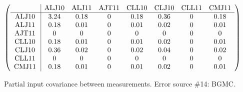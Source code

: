 \begin{table}[H]
\scriptsize
\begin{center}
\renewcommand{\arraystretch}{1.1}
\begin{math}\left(\begin{array}{c|ccccccc}
 & \mathrm{ALJ10} & 
\mathrm{ALJ11} & 
\mathrm{AJT11} & 
\mathrm{CLL10} & 
\mathrm{CLJ10} & 
\mathrm{CLL11} & 
\mathrm{CMJ11} \\
\hline
\mathrm{ALJ10} \hspace*{2pt} &       3.24 &       0.18 &  0 &       0.18 &       0.36 &  0 &       0.18 \\
\mathrm{ALJ11} \hspace*{2pt} &       0.18 &       0.01 &  0 &       0.01 &       0.02 &  0 &       0.01 \\
\mathrm{AJT11} \hspace*{2pt} &  0 &  0 &  0 &  0 &  0 &  0 &  0 \\
\mathrm{CLL10} \hspace*{2pt} &       0.18 &       0.01 &  0 &       0.01 &       0.02 &  0 &       0.01 \\
\mathrm{CLJ10} \hspace*{2pt} &       0.36 &       0.02 &  0 &       0.02 &       0.04 &  0 &       0.02 \\
\mathrm{CLL11} \hspace*{2pt} &  0 &  0 &  0 &  0 &  0 &  0 &  0 \\
\mathrm{CMJ11} \hspace*{2pt} &       0.18 &       0.01 &  0 &       0.01 &       0.02 &  0 &       0.01 \\
\end{array}\right)\end{math}
\caption{Partial input covariance between measurements. Error source \#14: BGMC.}
\renewcommand{\arraystretch}{1}
\end{center}
\end{table}
